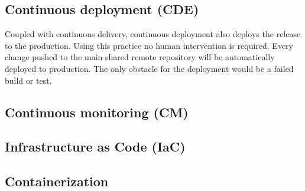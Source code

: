 \subsection{Continuous deployment (CDE)} Coupled with continuous delivery, continuous deployment also deploys the release to the production. Using this practice no human intervention is required. Every change pushed to the main shared remote repository will be automatically deployed to production. The only obstacle for the deployment would be a failed build or test.

\subsection{Continuous monitoring (CM)} 

\subsection{Infrastructure as Code (IaC)}

\subsection{Containerization}











